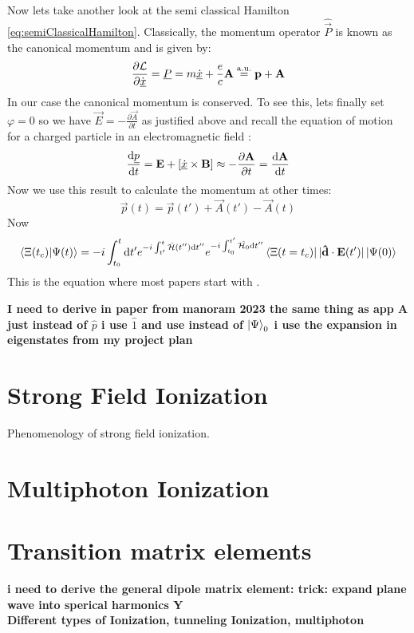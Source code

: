 Now lets take another look at the semi classical Hamilton \eqref{eq:semiClassicalHamilton}. Classically, the momentum operator $\hat{\vec{P}}$ is known as the canonical momentum and is given by:
\begin{equation*}
    \frac{\partial \mathcal{L}}{\partial \dot{\underline{x}}} = \underline{P} = m\underline{\dot{x}} + \frac{e}{c}\mathbf{A} \stackrel{\mathrm{a.u.}}{=} \mathbf{p} + \mathbf{A}
\end{equation*}
In our case the canonical momentum is conserved. To see this, lets finally set $\varphi=0$ so we have $\vec{E} = -\frac{\partial \vec{A}}{\partial t}$ as justified above and recall the equation of motion for a charged particle in an electromagnetic field \cite{LandauLifschitzBand2}:
\begin{equation*}
    \frac{\mathrm{d}\underline{p}}{\mathrm{d} t} = \mathbf{E} + \left[\underline{\dot{x}}\times\mathbf{B}\right] \approx -\frac{\partial \mathbf{A}}{\partial t} = \frac{\mathrm{d} \mathbf{A}}{\mathrm{d} t}
\end{equation*}
Now we use this result to calculate the momentum at other times:
\begin{equation*}
    \vec{p}(t) = \vec{p}(t') + \vec{A}(t') - \vec{A}(t)
\end{equation*}
Now
\begin{equation}
    \braket{\Xi(t_c)|\Psi(t)} = -i \int_{t_0}^{t} \mathrm{d} t' e^{-i \int_{t'}^{t} \hat{\mathcal{H}}(t'') \mathrm{d} t''}e^{-i \int_{t_0}^{t'} \hat{\mathcal{H}_0} \mathrm{d} t''} \bra{\Xi(t=t_c)}|\mathbf{\hat{d}}\cdot\mathbf{E}(t')|\ket{\Psi(0)}
\end{equation}
This is the equation where most papers start with \cite{Theory_NPS}.



\bf{I need to derive in paper from manoram 2023 the same thing as app A just instead of $\hat{p}$ i use $\hat{1}$ and use instead of $\ket{\Psi}_0$ i use the expansion in eigenstates from my project plan}







\newpage
\section{Strong Field Ionization}

Phenomenology of strong field ionization.










\newpage
\section{Multiphoton Ionization}


\newpage
\section{Transition matrix elements}
\bf{i need to derive the general dipole matrix element: trick: expand plane wave into sperical harmonics Y}\\



Different types of Ionization, tunneling Ionization, multiphoton